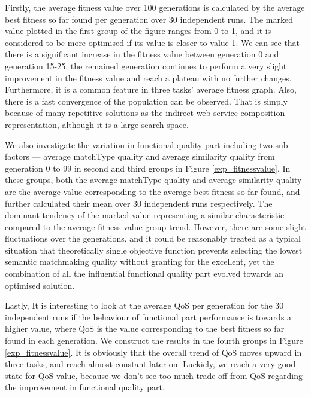\documentclass{llncs}
\begin{document}
Firstly, the average fitness value over 100 generations is calculated by the average best fitness so far found per generation over 30 independent runs. The marked value plotted in the first group of the figure ranges from 0 to 1, and it is considered to be more optimised if its value is closer to value 1. We can see that there is a significant increase in the fitness value between generation 0 and generation 15-25, the remained generation continues to perform a very slight improvement in the fitness value and reach a plateau with no further changes. Furthermore, it is a common feature in three tasks’ average fitness graph. Also, there is a fast convergence of the population can be observed. That is simply because of many repetitive solutions as the indirect web service composition representation, although it is a large search space.

We also investigate the variation in functional quality part including two sub factors --- average matchType quality and average similarity quality from generation 0 to 99 in second and third groups in Figure \ref{exp_fitnessvalue}.  In these groups,  both the average matchType quality and average similarity quality are the average value corresponding to the average best fitness so far found,  and further calculated their mean over 30 independent runs respectively. The dominant tendency of the marked value representing a similar characteristic compared to the average fitness value group trend. However, there are some slight fluctuations over the generations, and it could be reasonably treated as a typical situation that theoretically single objective function prevents selecting the lowest semantic matchmaking quality without granting for the excellent, yet the combination of all the influential functional quality part evolved towards an optimised solution.

Lastly, It is interesting to look at the average QoS per generation for the 30 independent runs if the behaviour of functional part performance is towards a higher value, where QoS is the value corresponding to the best fitness so far found in each generation. We construct the results in the fourth groups in Figure \ref{exp_fitnessvalue}. It is obviously that the overall trend of QoS moves upward in three tasks, and reach almost constant later on. Luckiely, we reach a very good state for QoS value, because we don't see too much trade-off from QoS regarding the improvement in functional quality part. 
\end{document}
